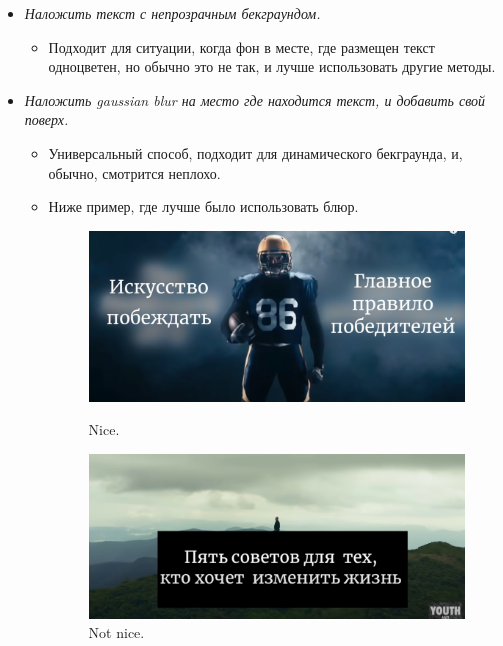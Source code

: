 \documentclass[
a4paper, %
12pt, %
article,
onecolumn, %
openany, %
]{memoir}
\begin{document}
\begin{itemize}
    \item \emph{Наложить текст с непрозрачным бекграундом.} 

        \begin{itemize}
            \item Подходит для ситуации, когда фон в месте, где размещен текст
        одноцветен, но обычно это не так, и лучше использовать другие методы.
        \end{itemize}

    \item \emph{Наложить gaussian blur на место где находится текст, и добавить
        свой поверх.}

        \begin{itemize}
            \item Универсальный способ, подходит для 
        динамического бекграунда, и, обычно, смотрится неплохо.

            \item Ниже пример, где лучше было использовать блюр.

\begin{figure}[!hbp]
\centering
\begin{minipage}[b]{0.4\textwidth}
\includegraphics[width=\textwidth]{titleBlur}
\caption{Nice.}
\end{minipage}
\hfill
\begin{minipage}[b]{0.4\textwidth}
\includegraphics[width=\textwidth]{titleBlurBad}
\caption{Not nice.}
\end{minipage}
\end{figure}


\end{itemize}
\end{itemize}
\end{document}
